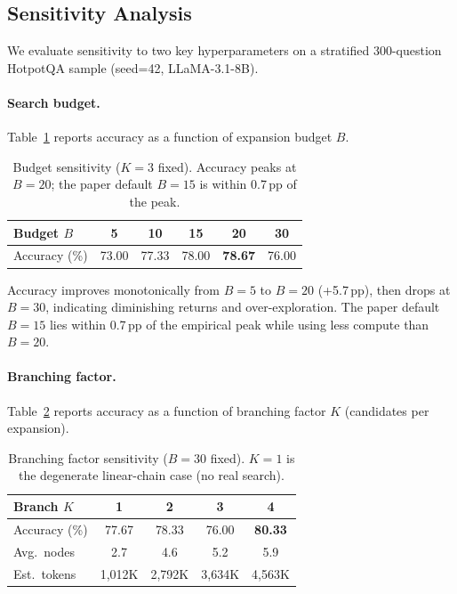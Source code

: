 \documentclass{article}
\newcommand{\pp}{\,pp\xspace}
\begin{document}
\subsection{Sensitivity Analysis}
\label{sec:sensitivity}

We evaluate sensitivity to two key hyperparameters on a stratified
300-question HotpotQA sample (seed=42, LLaMA-3.1-8B).

\paragraph{Search budget.}
Table~\ref{tab:budget} reports accuracy as a function of expansion budget $B$.

\begin{table}[t]
\centering
\caption{Budget sensitivity ($K{=}3$ fixed).  Accuracy peaks at $B{=}20$;
the paper default $B{=}15$ is within 0.7\pp of the peak.}
\label{tab:budget}
\small
\begin{tabular}{@{}lccccc@{}}
\toprule
\textbf{Budget $B$} & 5 & 10 & 15 & 20 & 30 \\
\midrule
Accuracy (\%) & 73.00 & 77.33 & 78.00 & \textbf{78.67} & 76.00 \\
\bottomrule
\end{tabular}
\end{table}

Accuracy improves monotonically from $B{=}5$ to $B{=}20$ (+5.7\pp), then
drops at $B{=}30$, indicating diminishing returns and over-exploration.  The
paper default $B{=}15$ lies within 0.7\pp of the empirical peak while using
less compute than $B{=}20$.

\paragraph{Branching factor.}
Table~\ref{tab:branching} reports accuracy as a function of branching factor
$K$ (candidates per expansion).

\begin{table}[t]
\centering
\caption{Branching factor sensitivity ($B{=}30$ fixed).  $K{=}1$ is the
degenerate linear-chain case (no real search).}
\label{tab:branching}
\small
\begin{tabular}{@{}lcccc@{}}
\toprule
\textbf{Branch $K$} & 1 & 2 & 3 & 4 \\
\midrule
Accuracy (\%) & 77.67 & 78.33 & 76.00 & \textbf{80.33} \\
Avg.\ nodes   & 2.7   & 4.6   & 5.2   & 5.9 \\
Est.\ tokens  & 1,012K & 2,792K & 3,634K & 4,563K \\
\bottomrule
\end{tabular}
\end{table}
\end{document}
